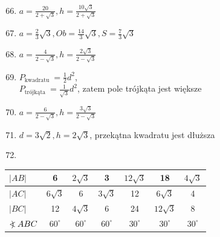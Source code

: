 \documentclass[10pt]{article}
\newcommand\Varangle{\mathop{{<\!\!\!\!\!\text{\small)}}\:}\nolimits}
\begin{document}
\begin{enumerate}
  \setcounter{enumi}{65}
  \item \(a=\frac{20}{2+\sqrt{3}}, h=\frac{10 \sqrt{3}}{2+\sqrt{3}}\)
  \item \(a=\frac{2}{3} \sqrt{3}, O b=\frac{14}{3} \sqrt{3}, S=\frac{7}{3} \sqrt{3}\)
  \item \(a=\frac{4}{2-\sqrt{3}}, h=\frac{2 \sqrt{3}}{2-\sqrt{3}}\)
  \item \(P_{\text {kwadratu }}=\frac{1}{2} d^{2}\),\\
\(P_{\text {trójkąta }}=\frac{1}{\sqrt{3}} d^{2}\), zatem pole trójkąta jest większe
  \item \(a=\frac{6}{2-\sqrt{3}}, h=\frac{3 \sqrt{3}}{2-\sqrt{3}}\)
  \item \(d=3 \sqrt{2}, h=2 \sqrt{3}\), przekątna kwadratu jest dłuższa
  \item 
\end{enumerate}

\begin{center}
\begin{tabular}{|l|c|c|c|c|c|c|}
\hline
\(|A B|\) & 6 & \(2 \sqrt{3}\) & 3 & \(12 \sqrt{3}\) & 18 & \(4 \sqrt{3}\) \\
\hline
\(|A C|\) & \(6 \sqrt{3}\) & 6 & \(3 \sqrt{3}\) & 12 & \(6 \sqrt{3}\) & 4 \\
\hline
\(|B C|\) & 12 & \(4 \sqrt{3}\) & 6 & 24 & \(12 \sqrt{3}\) & 8 \\
\hline
\(\Varangle A B C\) & \(60^{\circ}\) & \(60^{\circ}\) & \(60^{\circ}\) & \(30^{\circ}\) & \(30^{\circ}\) & \(30^{\circ}\) \\
\hline
\end{tabular}
\end{center}
\end{document}
